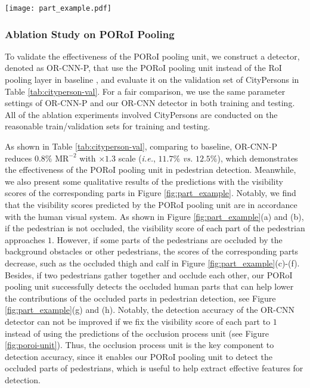 \documentclass[runningheads]{llncs}
\def\ie{{\em i.e.}}
\begin{document}
\begin{figure*}[t]
\centering
\texttt{[image: part\_example.pdf]}
\caption{Some examples of the predicted visibility scores of the pedestrian parts using the proposed PORoI pooling unit.}
\label{fig:part_example}
\end{figure*}


\subsubsection{Ablation Study on PORoI Pooling}
To validate the effectiveness of the PORoI pooling unit, we construct a detector, denoted as OR-CNN-P, that use the PORoI pooling unit instead of the RoI pooling layer in baseline \cite{DBLP:conf/cvpr/ZhangBS17}, and evaluate it on the validation set of CityPersons in Table \ref{tab:cityperson-val}. For a fair comparison, we use the same parameter settings of OR-CNN-P and our OR-CNN detector in both training and testing. All of the ablation experiments involved CityPersons are conducted on the reasonable train/validation sets for training and testing.

As shown in Table \ref{tab:cityperson-val}, comparing to baseline, OR-CNN-P reduces $0.8\%$ $\text{MR}^{-2}$ with $\times1.3$ scale (\ie, $11.7\%$ {\em vs.} $12.5\%$), which demonstrates the effectiveness of the PORoI pooling unit in pedestrian detection. Meanwhile, we also present some qualitative results of the predictions with the visibility scores of the corresponding parts in Figure \ref{fig:part_example}. Notably, we find that the visibility scores predicted by the PORoI pooling unit are in accordance with the human visual system. As shown in Figure \ref{fig:part_example}(a) and (b), if the pedestrian is not occluded, the visibility score of each part of the pedestrian approaches $1$. However, if some parts of the pedestrians are occluded by the background obstacles or other pedestrians, the scores of the corresponding parts decrease, such as the occluded thigh and calf in Figure \ref{fig:part_example}(c)-(f). Besides, if two pedestrians gather together and occlude each other, our PORoI pooling unit successfully detects the occluded human parts that can help lower the contributions of the occluded parts in pedestrian detection, see Figure \ref{fig:part_example}(g) and (h). Notably, the detection accuracy of the OR-CNN detector can not be improved if we fix the visibility score of each part to $1$ instead of using the predictions of the occlusion process unit (see Figure \ref{fig:poroi-unit}). Thus, the occlusion process unit is the key component to detection accuracy, since it enables our PORoI pooling unit to detect the occluded parts of pedestrians, which is useful to help extract effective features for detection.
\end{document}
